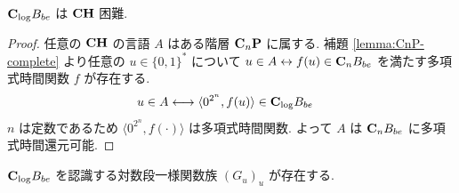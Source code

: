 \begin{lemma}
 $\mathbf{C}_{\log} B_{be}$ は $\mathbf{CH}$ 困難.
\end{lemma}

\begin{proof}
 任意の $\mathbf{CH}$ の言語 $A$ はある階層 $\mathbf{C}_n \mathbf{P}$ に属する. 
 補題 \ref{lemma:CnP-complete} より任意の $u \in \{0,1\}^*$ について
 $u \in A \leftrightarrow f(u) \in \mathbf{C}_n B_{be}$ 
 を満たす多項式時間関数 $f$ が存在する.
 \begin{align}
  u \in A 
  & \longleftrightarrow \langle 0^{2^n}, f(u) \rangle \in \mathbf{C}_{\log} B_{be}
 \end{align}
 $n$ は定数であるため $\langle 0^{2^n}, f(\cdot) \rangle$ は多項式時間関数.
 よって $A$ は $\mathbf{C}_n B_{be}$ に多項式時間還元可能.
\end{proof}

\begin{lemma}
 $\mathbf{C}_{\log} B_{be}$ を認識する対数段一様関数族 $(G_u)_u$ が存在する.
\end{lemma}

